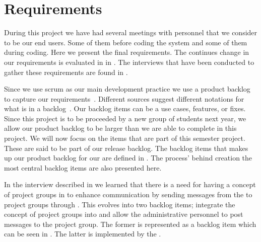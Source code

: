 \section{Requirements}
\label{sec:requirements}
During this project we have had several meetings with personnel that we consider to be our end users.
Some of them before coding the system and some of them during coding.
Here we present the final requirements.
The continues change in our requirements is evaluated in  in .
The interviews that have been conducted to gather these requirements are found in .

Since we use scrum as our main development practice we use a product backlog to capture our requirements~\cite[p.~114]{Larman04}.
Different sources suggest different notations for what is in a backlog~\cite[p.~17]{scrumchecklist}\cite[pp.~123-124]{Larman04}.
Our backlog items can be a use cases, features, or fixes.
Since this project is to be proceeded by a new group of students next year, we allow our product backlog to be larger than we are able to complete in this project.
We will now focus on the items that are part of this semester project.
These are said to be part of our release backlog.
The backlog items that makes up our product backlog for our \subsystem{} are defined in .
The process' behind creation the most central backlog items are also presented here.

In the interview described in  we learned that there is a need for having a concept of project groups in \moodle{} to enhance communication by sending messages from the \admpers{} to project groups through \moodle{}.
This evolves into two backlog items; integrate the concept of project groups into \moodle{} and allow the administrative personnel to post messages to the project group.
The former is represented as a backlog item which can be seen in .
The latter is implemented by the \supervisorgroup{}.

